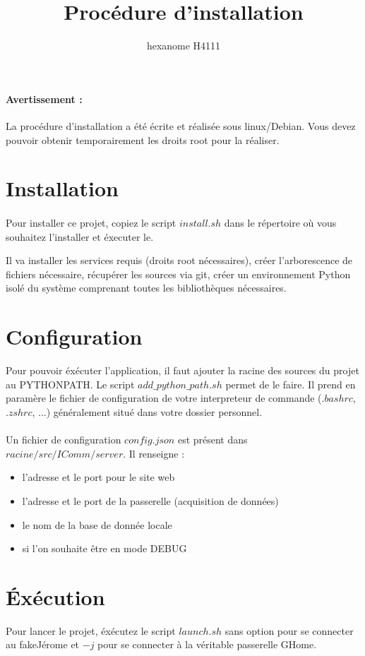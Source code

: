 \documentclass[10pt,a4paper]{article}
\author{hexanome H4111}
\title{Procédure d'installation}
\begin{document}
\paragraph{Avertissement : }La procédure d'installation a été écrite et réalisée sous linux/Debian. Vous devez pouvoir obtenir temporairement les droits root pour la réaliser.
\section{Installation}
\paragraph{} Pour installer ce projet, copiez le script $install.sh$ dans le répertoire où vous souhaitez l'installer et éxecuter le.

Il va installer les services requis (droits root nécessaires), créer l'arborescence de fichiers nécessaire, récupérer les sources via git, créer un environnement Python isolé du système comprenant toutes les bibliothèques nécessaires.

\section{Configuration}
Pour pouvoir éxécuter l'application, il faut ajouter la racine des sources du projet au PYTHONPATH. Le script $add\_python\_path.sh$ permet de le faire. Il prend en paramère le fichier de configuration de votre interpreteur de commande ($.bashrc$,$.zshrc$, ...) généralement situé dans votre dossier personnel.
\paragraph{} Un fichier de configuration $config.json$ est présent dans $racine/src/IComm/server$. Il renseigne  : 
\begin{itemize}
\item l'adresse et le port pour le site web
\item l'adresse et le port de la passerelle (acquisition de données)
\item le nom de la base de donnée locale
\item si l'on souhaite être en mode DEBUG
\end{itemize}
\section{\'{E}xécution}
Pour lancer le projet, éxécutez le script $launch.sh$ sans option pour se connecter au fakeJérome et $-j$ pour se connecter à la véritable passerelle GHome.
\end{document}
